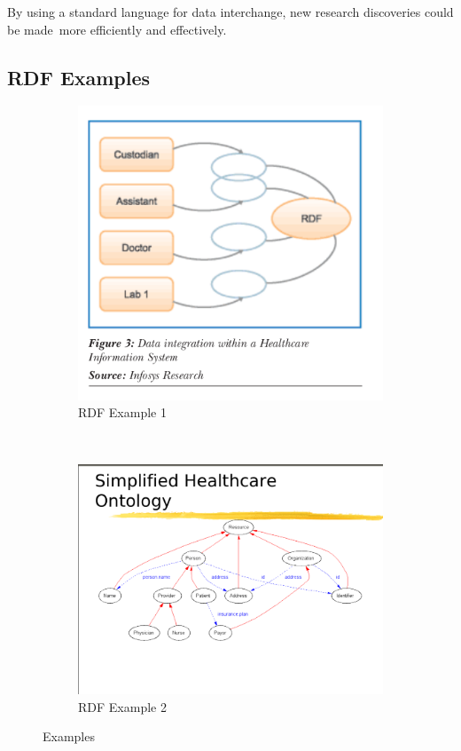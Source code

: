   \noindent By using a standard language for data interchange, new research discoveries could be made\
  more efficiently and effectively.\

  \subsection{RDF Examples}
  \begin{figure}[h!]
    \begin{subfigure}[b]{.5\linewidth}
      \includegraphics[width=1.0\textwidth]{rdfh.png}
      \caption{RDF Example 1}
      \label{fig:third}
    \end{subfigure}
    ~
    \begin{subfigure}[b]{.5\linewidth}
      \includegraphics[trim=4 1 1 7,clip,width=\textwidth]{rdf1.png}
      \caption{RDF Example 2}
      \label{fig:fourth}
    \end{subfigure}
    \caption{Examples}
    \label{fig:rdf_examples}
  \end{figure}

